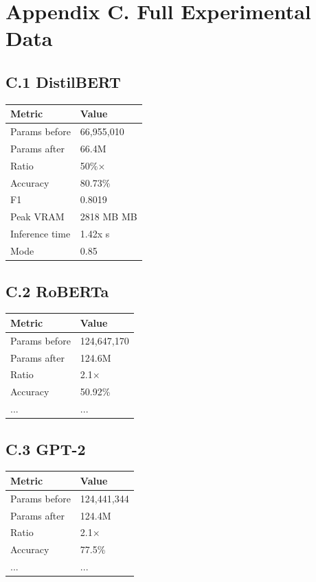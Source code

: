 
\section{Appendix C. Full Experimental Data}

\subsection{C.1 DistilBERT}

\begin{table}[H]
\centering
\small
\begin{tabular}{ll}
\toprule
\textbf{Metric} & \textbf{Value} \\
\midrule
Params before & 66,955,010 \\
Params after & 66.4M \\
Ratio & 50\%$\times$ \\
Accuracy & 80.73\% \\
F1 & 0.8019 \\
Peak VRAM & 2818 MB MB \\
Inference time & 1.42x s \\
Mode & 0.85 \\
\bottomrule
\end{tabular}
\end{table}

\subsection{C.2 RoBERTa}

\begin{table}[H]
\centering
\small
\begin{tabular}{ll}
\toprule
\textbf{Metric} & \textbf{Value} \\
\midrule
Params before & 124,647,170 \\
Params after & 124.6M \\
Ratio & 2.1$\times$ \\
Accuracy & 50.92\% \\
... & ... \\
\bottomrule
\end{tabular}
\end{table}

\subsection{C.3 GPT-2}

\begin{table}[H]
\centering
\small
\begin{tabular}{ll}
\toprule
\textbf{Metric} & \textbf{Value} \\
\midrule
Params before & 124,441,344 \\
Params after & 124.4M \\
Ratio & 2.1$\times$ \\
Accuracy & 77.5\% \\
... & ... \\
\bottomrule
\end{tabular}
\end{table}

